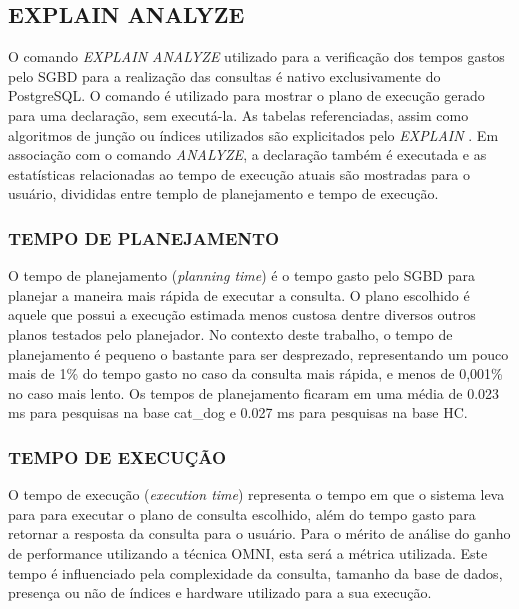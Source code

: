 \subsection{EXPLAIN ANALYZE}
O comando \textit{EXPLAIN ANALYZE} utilizado para a verificação dos tempos gastos pelo SGBD para a realização das consultas é nativo exclusivamente do PostgreSQL. O comando é utilizado para
mostrar o plano de execução gerado para uma declaração, sem executá-la. As tabelas referenciadas, assim como algoritmos de junção ou índices utilizados são
explicitados pelo \textit{EXPLAIN} \cite{POSTGRESQL2017}. Em associação com o comando \textit{ANALYZE}, a declaração também é executada e as estatísticas relacionadas ao tempo de execução atuais são mostradas para o usuário, divididas entre templo de planejamento e tempo de execução.

\subsubsection{TEMPO DE PLANEJAMENTO}
O tempo de planejamento (\textit{planning time}) é o tempo gasto pelo SGBD para planejar a maneira mais rápida de executar a consulta. O plano escolhido
é aquele que possui a execução estimada menos custosa dentre diversos outros planos testados pelo planejador. No contexto deste trabalho, o tempo de planejamento 
é pequeno o bastante para ser desprezado, representando um pouco mais de 1\% do tempo gasto no caso da consulta mais rápida, e menos de 0,001\% no caso mais lento. Os tempos de planejamento ficaram em uma média de 0.023 ms para
pesquisas na base cat\_dog e 0.027 ms para pesquisas na base HC.

\subsubsection{TEMPO DE EXECUÇÃO}
O tempo de execução (\textit{execution time}) representa o tempo em que o sistema leva para para executar o plano de consulta escolhido, além do tempo gasto para retornar 
a resposta da consulta para o usuário. Para o mérito de análise do ganho de performance utilizando a técnica OMNI, esta será a métrica utilizada. Este tempo é influenciado pela
complexidade da consulta, tamanho da base de dados, presença ou não de índices e hardware utilizado para a sua execução. 

